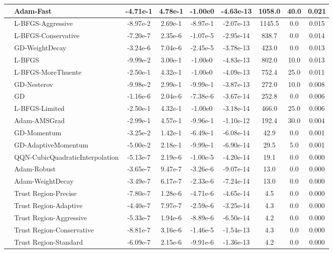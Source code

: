 \documentclass[10pt]{article}
\begin{document}
\begin{longtable}{|l|l|c|c|c|c|c|c|c|}
\hline
 & Adam-Fast & -4.71e-1 & 4.78e-1 & -1.00e0 & -4.63e-13 & 1058.0 & 40.0 & 0.021 \\
\hline
 & L-BFGS-Aggressive & -8.97e-2 & 2.69e-1 & -8.97e-1 & -2.07e-13 & 1145.5 & 0.0 & 0.015 \\
\hline
 & L-BFGS-Conservative & -7.20e-7 & 2.35e-6 & -1.07e-5 & -2.95e-14 & 838.7 & 0.0 & 0.014 \\
\hline
 & GD-WeightDecay & -3.24e-6 & 7.04e-6 & -2.45e-5 & -3.78e-13 & 423.0 & 0.0 & 0.013 \\
\hline
 & L-BFGS & -9.99e-2 & 3.00e-1 & -1.00e0 & -4.83e-13 & 802.0 & 10.0 & 0.013 \\
\hline
 & L-BFGS-MoreThuente & -2.50e-1 & 4.32e-1 & -1.00e0 & -4.09e-13 & 752.4 & 25.0 & 0.011 \\
\hline
 & GD-Nesterov & -9.98e-2 & 2.99e-1 & -9.99e-1 & -3.87e-13 & 272.0 & 10.0 & 0.008 \\
\hline
 & GD & -1.16e-6 & 2.04e-6 & -7.38e-6 & -3.67e-14 & 252.8 & 0.0 & 0.006 \\
\hline
 & L-BFGS-Limited & -2.50e-1 & 4.32e-1 & -1.00e0 & -3.18e-14 & 466.0 & 25.0 & 0.006 \\
\hline
 & Adam-AMSGrad & -2.99e-1 & 4.57e-1 & -9.96e-1 & -1.10e-12 & 192.4 & 30.0 & 0.004 \\
\hline
 & GD-Momentum & -3.25e-2 & 1.42e-1 & -6.49e-1 & -6.08e-14 & 42.9 & 0.0 & 0.001 \\
\hline
 & GD-AdaptiveMomentum & -5.00e-2 & 2.18e-1 & -9.99e-1 & -6.90e-14 & 29.5 & 5.0 & 0.001 \\
\hline
 & QQN-CubicQuadraticInterpolation & -5.13e-7 & 2.19e-6 & -1.00e-5 & -4.20e-14 & 19.1 & 0.0 & 0.000 \\
\hline
 & Adam-Robust & -3.65e-7 & 9.47e-7 & -3.26e-6 & -9.07e-14 & 13.0 & 0.0 & 0.000 \\
\hline
 & Adam-WeightDecay & -3.49e-7 & 6.17e-7 & -2.33e-6 & -7.24e-14 & 13.0 & 0.0 & 0.000 \\
\hline
 & Trust Region-Precise & -7.80e-7 & 1.28e-6 & -4.71e-6 & -4.65e-14 & 4.5 & 0.0 & 0.000 \\
\hline
 & Trust Region-Adaptive & -4.40e-7 & 7.97e-7 & -2.59e-6 & -3.25e-14 & 4.3 & 0.0 & 0.000 \\
\hline
 & Trust Region-Aggressive & -5.33e-7 & 1.94e-6 & -8.89e-6 & -6.50e-14 & 4.2 & 0.0 & 0.000 \\
\hline
 & Trust Region-Conservative & -8.81e-7 & 3.16e-6 & -1.46e-5 & -1.54e-13 & 4.3 & 0.0 & 0.000 \\
\hline
 & Trust Region-Standard & -6.09e-7 & 2.15e-6 & -9.91e-6 & -1.36e-13 & 4.2 & 0.0 & 0.000 \\

\end{longtable}
\end{document}
